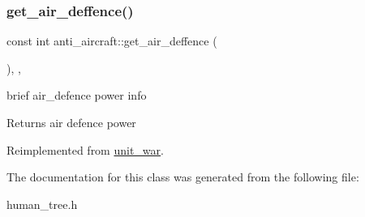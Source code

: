 \subsubsection{\texorpdfstring{get\+\_\+air\+\_\+deffence()}{get\_air\_deffence()}}
{\footnotesize\ttfamily const int anti\+\_\+aircraft\+::get\+\_\+air\+\_\+deffence (\begin{DoxyParamCaption}{ }\end{DoxyParamCaption})\hspace{0.3cm}{\ttfamily [inline]}, {\ttfamily [override]}, {\ttfamily [virtual]}}

brief air\+\_\+defence power info \begin{DoxyReturn}{Returns}
air defence power 
\end{DoxyReturn}


Reimplemented from \mbox{\hyperlink{classunit__war_af26f2da420a828230a329339bc9ef805}{unit\+\_\+war}}.



The documentation for this class was generated from the following file\+:\begin{DoxyCompactItemize}
\item 
human\+\_\+tree.\+h\end{DoxyCompactItemize}
